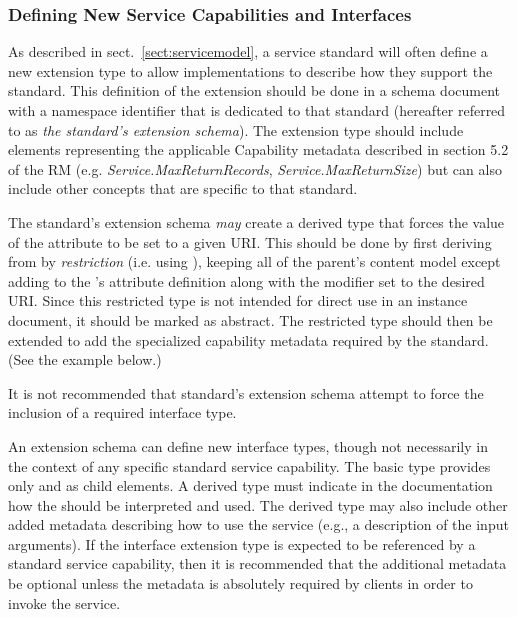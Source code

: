 \documentclass[11pt,a4paper]{ivoa}
\begin{document}
\subsubsection{Defining New Service Capabilities and Interfaces}
\label{sect:serviceelements}


As described in sect.~\ref{sect:servicemodel}, a service
standard will often define a new  extension
type to allow implementations to describe how they support the
standard.  This definition of the  extension
should be done in a schema document with a namespace identifier that
is dedicated to that standard (hereafter referred to as \emph{the
standard's extension schema}).  The extension type should include
elements representing the applicable Capability metadata described in
section 5.2 of the RM
(e.g. \emph{Service.MaxReturnRecords}, \emph{Service.MaxReturnSize})
but can also include other concepts that are specific to that standard.



The standard's extension schema \emph{may} create a derived
 type that forces the value of the
 attribute to be set to a given URI.  This
should be done by first deriving from  by
\emph{restriction} (i.e. using
), keeping all of the parent's
content model except adding to the 's attribute
definition  along with the
 modifier set to the desired URI.  Since this
restricted type is not intended for direct use in an instance
document, it should be marked as abstract.  The restricted type should
then be extended to add the specialized capability metadata required
by the standard.  (See the example below.)  



It is not recommended that standard's extension schema attempt to
force the inclusion of a required interface type.  



An extension schema can define new interface types, though not
necessarily in the context of any specific standard service
capability.  The basic  type provides only
 and  as child
elements.  A derived  type must indicate in
the documentation how the  should be
interpreted and used.  The derived type may also include other added
metadata describing how to use the service (e.g., a description of the
input arguments).  If the interface extension type is expected to be
referenced by a standard service capability, then it is recommended
that the additional metadata be optional unless the metadata is
absolutely required by clients in order to invoke the service.
\end{document}
